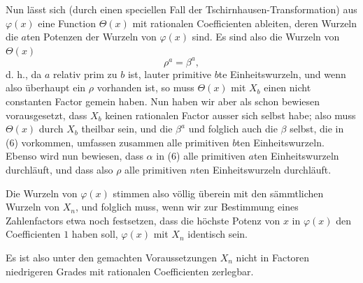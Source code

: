 \documentclass[11pt]{article}
\begin{document}
Nun lässt sich (durch einen speciellen Fall der Tschirnhausen-Transformation) aus $\varphi(x)$ eine Function $\Theta(x)$ mit rationalen Coefficienten ableiten, deren Wurzeln die $a$ten Potenzen der Wurzeln von $\varphi(x)$ sind. Es sind also die Wurzeln von $\Theta(x)$
\[
        \rho^a=\beta^a,
\]
d. h., da $a$ relativ prim zu $b$ ist, lauter primitive $b$te Einheitswurzeln, und wenn also überhaupt ein $\rho$ vorhanden ist, so muss $\Theta(x)$ mit $X_b$ einen nicht constanten Factor gemein haben. Nun haben wir aber als schon bewiesen vorausgesetzt, dass $X_b$ keinen rationalen Factor ausser sich selbst habe; also muss $\Theta(x)$ durch $X_b$ theilbar sein, und die $\beta^a$ und folglich auch die $\beta$ selbst, die in (6) vorkommen, umfassen zusammen alle primitiven $b$ten Einheitswurzeln. Ebenso wird nun bewiesen, dass $\alpha$ in (6) alle primitiven $a$ten Einheitswurzeln durchläuft, und dass also $\rho$ alle primitiven $n$ten Einheitswurzeln durchläuft.

Die Wurzeln von $\varphi(x)$ stimmen also völlig überein mit den sämmtlichen Wurzeln von $X_n$, und folglich muss, wenn wir zur Bestimmung eines Zahlenfactors etwa noch festsetzen, dass die höchste Potenz von $x$ in $\varphi(x)$ den Coefficienten $1$ haben soll, $\varphi(x)$ mit $X_n$ identisch sein.

Es ist also unter den gemachten Voraussetzungen $X_n$ nicht in Factoren niedrigeren Grades mit rationalen Coefficienten zerlegbar.
\end{document}
